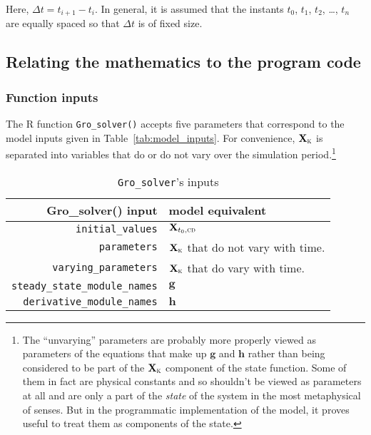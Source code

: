 \documentclass{article}
\newcommand{\code}[1]{\texttt{#1}}
\newcommand{\boldX}{\mathbf{X}}
\newcommand{\cd}{\textsc{cd}}
\newcommand{\kn}{\textsc{k}} %
\newcommand{\g}{\mathbf{g}}
\newcommand{\h}{\mathbf{h}}
\begin{document}
Here, $\Delta t = t_{i+1} - t_i$.  In general, it is assumed that the
instants $t_0$, $t_1$, $t_2$, \dots, $t_n$ are equally spaced so that $\Delta
t$ is of fixed size.



\subsection{Relating the mathematics to the program code}
\subsubsection{Function inputs}
\label{sec:solver_inputs}

The R function \code{Gro\_solver()} accepts five parameters that
correspond to the model inputs given in
Table~\ref{tab:model_inputs}. For convenience, $\boldX_\kn$ is
separated into variables that do or do not vary over the simulation
period.\footnote{The ``unvarying'' parameters are probably more
  properly viewed as parameters of the equations that make up $\g$ and
  $\h$ rather than being considered to be part of the $\boldX_\kn$
  component of the state function.  Some of them in fact are physical
  constants and so shouldn't be viewed as parameters at all and are
  only a part of the \emph{state} of the system in the most
  metaphysical of senses.  But in the programmatic implementation of
  the model, it proves useful to treat them as components of the
  state.}

\begin{table}[!htbp]
\begin{center}
\begin{tabular}{| r | l |}
	\hline
    \textbf{Gro\_solver() input} & \textbf{model equivalent} \\ 
    \hline
    \code{initial\_values} & $\boldX_{t_0,\cd}$ \\ 
    \code{parameters} & $\boldX_\kn$ that do not vary with time. \\ 
    \code{varying\_parameters} & $\boldX_\kn$ that do vary with time. \\ 
    \code{steady\_state\_module\_names} & $\g$ \\ 
    \code{derivative\_module\_names} & $\h$ \\
    \hline
\end{tabular}
\caption{\code{Gro\_solver}'s inputs}
\end{center}
\end{table}
\end{document}
